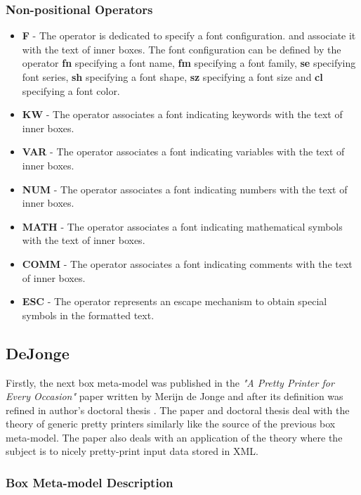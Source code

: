 \documentclass[12pt,notitlepage,a4paper]{report}
\begin{document}
\subsubsection{Non-positional Operators}
\begin{itemize}
\item \textbf{F} - The operator is dedicated to specify a font configuration. and associate it with the text of inner boxes. The font configuration can be defined by the operator \textbf{fn} specifying a font name, \textbf{fm} specifying a font family, \textbf{se} specifying font series, \textbf{sh} specifying a font shape, \textbf{sz} specifying a font size and \textbf{cl} specifying a font color. 
\item \textbf{KW} - The operator associates a font indicating keywords with the text of inner boxes. 
\item \textbf{VAR} - The operator associates a font indicating variables with the text of inner boxes. 
\item \textbf{NUM} - The operator associates a font indicating numbers with the text of inner boxes. 
\item \textbf{MATH} - The operator associates a font indicating mathematical symbols with the text of inner boxes. 
\item \textbf{COMM} - The operator associates a font indicating comments with the text of inner boxes. 
\item \textbf{ESC} - The operator represents an escape mechanism to obtain special symbols in the formatted text.
\end{itemize}

\subsection {DeJonge}

Firstly, the next box meta-model was published in the \textit{"A Pretty Printer for Every Occasion"} paper \cite{DeJonge} written by Merijn de Jonge and after its definition was refined in author's doctoral thesis \cite{DeJongePhD}.  The paper and doctoral thesis deal with the theory of generic pretty printers similarly like the source of the previous box meta-model. The paper also deals with an application of the theory where the subject is to nicely pretty-print input data stored in XML.

\subsubsection{Box Meta-model Description}
\end{document}

